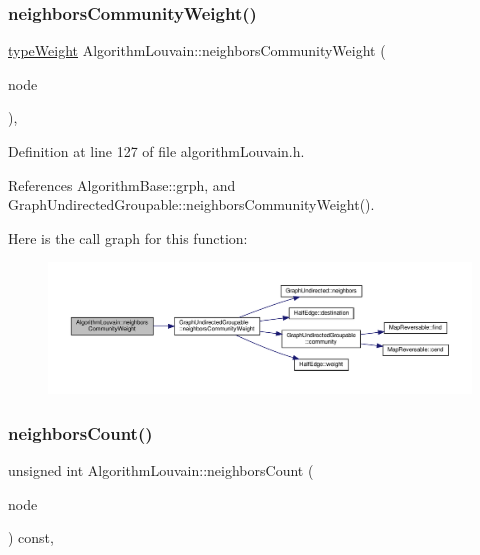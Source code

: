 \subsubsection{\texorpdfstring{neighbors\+Community\+Weight()}{neighborsCommunityWeight()}\hspace{0.1cm}{\footnotesize\ttfamily [2/2]}}
{\footnotesize\ttfamily \hyperlink{edge_8h_a2e7ea3be891ac8b52f749ec73fee6dd2}{type\+Weight} Algorithm\+Louvain\+::neighbors\+Community\+Weight (\begin{DoxyParamCaption}\item[{const \hyperlink{edge_8h_a5fbd20c46956d479cb10afc9855223f6}{type\+Vertex} \&}]{node }\end{DoxyParamCaption})\hspace{0.3cm}{\ttfamily [inline]}, {\ttfamily [private]}}



Definition at line 127 of file algorithm\+Louvain.\+h.



References Algorithm\+Base\+::grph, and Graph\+Undirected\+Groupable\+::neighbors\+Community\+Weight().

Here is the call graph for this function\+:
\nopagebreak
\begin{figure}[H]
\begin{center}
\leavevmode
\includegraphics[width=350pt]{classAlgorithmLouvain_a97fc0efead8492fc78167a3ad4f808fc_cgraph}
\end{center}
\end{figure}
\mbox{\label{classAlgorithmLouvain_a2fb0859e6b2dfdd4285cc865a2b2531f}} 
\subsubsection{\texorpdfstring{neighbors\+Count()}{neighborsCount()}}
{\footnotesize\ttfamily unsigned int Algorithm\+Louvain\+::neighbors\+Count (\begin{DoxyParamCaption}\item[{const \hyperlink{edge_8h_a5fbd20c46956d479cb10afc9855223f6}{type\+Vertex} \&}]{node }\end{DoxyParamCaption}) const\hspace{0.3cm}{\ttfamily [inline]}, {\ttfamily [private]}}



